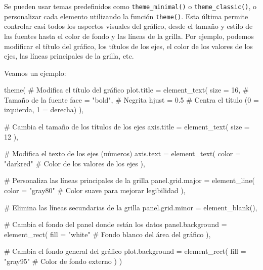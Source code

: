 \documentclass[
  letterpaper,
  DIV=11,
  numbers=noendperiod,
  oneside]{scrreprt}
\newenvironment{Shaded}{\begin{snugshade}}{\end{snugshade}}
\newcommand{\AttributeTok}[1]{\textcolor[rgb]{0.40,0.45,0.13}{#1}}
\newcommand{\CommentTok}[1]{\textcolor[rgb]{0.37,0.37,0.37}{#1}}
\newcommand{\DecValTok}[1]{\textcolor[rgb]{0.68,0.00,0.00}{#1}}
\newcommand{\FloatTok}[1]{\textcolor[rgb]{0.68,0.00,0.00}{#1}}
\newcommand{\FunctionTok}[1]{\textcolor[rgb]{0.28,0.35,0.67}{#1}}
\newcommand{\NormalTok}[1]{\textcolor[rgb]{0.00,0.23,0.31}{#1}}
\newcommand{\StringTok}[1]{\textcolor[rgb]{0.13,0.47,0.30}{#1}}
\begin{document}
Se pueden usar temas predefinidos como \texttt{theme\_minimal()} o
\texttt{theme\_classic()}, o personalizar cada elemento utilizando la
función \texttt{theme()}. Esta última permite controlar casi todos los
aspectos visuales del gráfico, desde el tamaño y estilo de las fuentes
hasta el color de fondo y las líneas de la grilla. Por ejemplo, podemos
modificar el título del gráfico, los títulos de los ejes, el color de
los valores de los ejes, las líneas principales de la grilla, etc.

Veamos un ejemplo:

\begin{Shaded}
\begin{Highlighting}[]
  \FunctionTok{theme}\NormalTok{(}
    \CommentTok{\# Modifica el título del gráfico}
    \AttributeTok{plot.title =} \FunctionTok{element\_text}\NormalTok{(}
      \AttributeTok{size =} \DecValTok{16}\NormalTok{,       }\CommentTok{\# Tamaño de la fuente}
      \AttributeTok{face =} \StringTok{"bold"}\NormalTok{,   }\CommentTok{\# Negrita}
      \AttributeTok{hjust =} \FloatTok{0.5}      \CommentTok{\# Centra el título (0 = izquierda, 1 = derecha)}
\NormalTok{    ),}
    
    \CommentTok{\# Cambia el tamaño de los títulos de los ejes}
    \AttributeTok{axis.title =} \FunctionTok{element\_text}\NormalTok{(}
      \AttributeTok{size =} \DecValTok{12}
\NormalTok{    ),}
    
    \CommentTok{\# Modifica el texto de los ejes (números)}
    \AttributeTok{axis.text =} \FunctionTok{element\_text}\NormalTok{(}
      \AttributeTok{color =} \StringTok{"darkred"}   \CommentTok{\# Color de los valores de los ejes}
\NormalTok{    ),}
    
    \CommentTok{\# Personaliza las líneas principales de la grilla}
    \AttributeTok{panel.grid.major =} \FunctionTok{element\_line}\NormalTok{(}
      \AttributeTok{color =} \StringTok{"gray80"}    \CommentTok{\# Color suave para mejorar legibilidad}
\NormalTok{    ),}
    
    \CommentTok{\# Elimina las líneas secundarias de la grilla}
    \AttributeTok{panel.grid.minor =} \FunctionTok{element\_blank}\NormalTok{(),}
    
    \CommentTok{\# Cambia el fondo del panel donde están los datos}
    \AttributeTok{panel.background =} \FunctionTok{element\_rect}\NormalTok{(}
      \AttributeTok{fill =} \StringTok{"white"}      \CommentTok{\# Fondo blanco del área del gráfico}
\NormalTok{    ),}
    
    \CommentTok{\# Cambia el fondo general del gráfico}
    \AttributeTok{plot.background =} \FunctionTok{element\_rect}\NormalTok{(}
      \AttributeTok{fill =} \StringTok{"gray95"}     \CommentTok{\# Color de fondo externo}
\NormalTok{    )}
\NormalTok{  )}
\end{Highlighting}
\end{Shaded}
\end{document}
